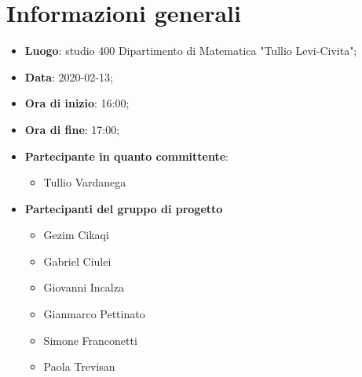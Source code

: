 \section{Informazioni generali}
	\begin{itemize}
		\item \textbf{Luogo}: studio 400 Dipartimento di Matematica "Tullio Levi-Civita";
		\item \textbf{Data}: 2020-02-13;
		\item \textbf{Ora di inizio}: 16:00;
		\item \textbf{Ora di fine}: 17:00;
		\item \textbf{Partecipante in quanto committente}:
		\begin{itemize}
			\item Tullio Vardanega
		\end{itemize}
		\item \textbf{Partecipanti del gruppo di progetto}
		\begin{itemize}
			\item Gezim Cikaqi
			\item Gabriel Ciulei
			\item Giovanni Incalza
			\item Gianmarco Pettinato
			\item Simone Franconetti
			\item Paola Trevisan
		\end{itemize}
		
	\end{itemize}